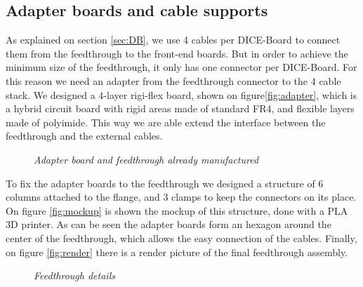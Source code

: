 \subsection{Adapter boards and cable supports}

As explained on section \ref{sec:DB}, we use 4 cables per DICE-Board to connect them from the feedthrough to the front-end boards. But in order to achieve the minimum size of the feedthrough, it only has one connector per DICE-Board. For this reason we need an adapter from the feedthrough connector to the 4 cable stack. We designed a 4-layer rigi-flex board, shown on figure\ref{fig:adapter}, which is a hybrid circuit board with rigid areas made of standard FR4, and flexible layers made of polyimide. This way we are able extend the interface between the feedthrough and the external cables.

\begin{figure}[ht]
  \centering
  \hspace{10mm}             
  \caption{\textit{Adapter board and feedthrough already manufactured}}
\end{figure}

To fix the adapter boards to the feedthrough we designed a structure of 6 columns attached to the flange, and 3 clamps to keep the connectors on its place. On figure \ref{fig:mockup} is shown the mockup of this structure, done with a PLA 3D printer. As can be seen the adapter boards form an hexagon around the center of the feedthrough, which allows the easy connection of the cables. Finally, on figure \ref{fig:render} there is a render picture of the final feedthrough assembly.

\begin{figure}[ht]
  \centering
  \hspace{10mm}             
  \caption{\textit{Feedthrough details}}
  \label{fig:ft:mockuprender}
\end{figure}


